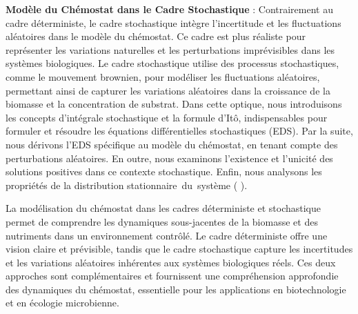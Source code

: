 \documentclass[12pt,a4paper]{report}%
\begin{document}
{\bf   Modèle du Chémostat dans le Cadre Stochastique} : Contrairement au cadre déterministe, le cadre stochastique intègre l'incertitude et les fluctuations aléatoires dans le modèle du chémostat. Ce cadre est plus réaliste pour représenter les variations naturelles et les perturbations imprévisibles dans les systèmes biologiques. Le cadre stochastique utilise des processus stochastiques, comme le mouvement brownien, pour modéliser les fluctuations aléatoires, permettant ainsi de capturer les variations aléatoires dans la croissance de la biomasse et la concentration de substrat. Dans cette optique, nous introduisons les concepts d’intégrale stochastique et la formule d’Itô, indispensables pour formuler et résoudre les équations différentielles stochastiques (EDS). Par la suite, nous dérivons l’EDS spécifique au modèle du chémostat, en tenant compte des perturbations aléatoires. En outre, nous examinons l’existence et l’unicité des solutions positives dans ce contexte stochastique. Enfin, nous analysons les propriétés de la distribution stationnaire du système ( \cite{w} ).\\
\vspace*{0.3cm}

La modélisation du chémostat dans les cadres déterministe et stochastique permet de comprendre les dynamiques sous-jacentes de la biomasse et des nutriments dans un environnement contrôlé. Le cadre déterministe offre une vision claire et prévisible, tandis que le cadre stochastique capture les incertitudes et les variations aléatoires inhérentes aux systèmes biologiques réels. Ces deux approches sont complémentaires et fournissent une compréhension approfondie des dynamiques du chémostat, essentielle pour les applications en biotechnologie et en écologie microbienne.
\newpage
\end{document}
